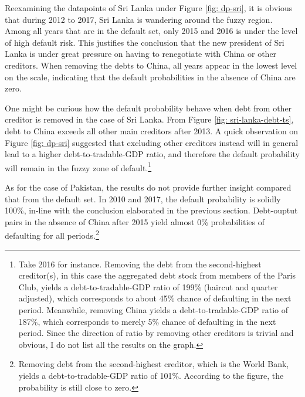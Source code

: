 Reexamining the datapoints of Sri Lanka under Figure \ref{fig: dp-sri}, it is obvious that during 2012 to 2017, Sri Lanka is wandering around the fuzzy region. Among all years that are in the default set, only 2015 and 2016 is under the level of high default risk. This justifies the conclusion that the new president of Sri Lanka is under great pressure on having to renegotiate with China or other creditors. When removing the debts to China, all years appear in the lowest level on the scale, indicating that the default probabilities in the absence of China are zero.

One might be curious how the default probability behave when debt from other creditor is removed in the case of Sri Lanka. From Figure \ref{fig: sri-lanka-debt-ts}, debt to China exceeds all other main creditors after 2013. A quick observation on Figure \ref{fig: dp-sri} suggested that excluding other creditors instead will in general lead to a higher debt-to-tradable-GDP ratio, and therefore the default probability will remain in the fuzzy zone of default.\footnote{%
    Take 2016 for instance. Removing the debt from the second-highest creditor(s), in this case the aggregated debt stock from members of the Paris Club, yields a debt-to-tradable-GDP ratio of 199\% (haircut and quarter adjusted), which corresponds to about 45\% chance of defaulting in the next period. Meanwhile, removing China yields a debt-to-tradable-GDP ratio of 187\%, which corresponds to merely 5\% chance of defaulting in the next period. Since the direction of ratio by removing other creditors is trivial and obvious, I do not list all the results on the graph.
}

As for the case of Pakistan, the results do not provide further insight compared that from the default set. In 2010 and 2017, the default probability is solidly 100\%, in-line with the conclusion elaborated in the previous section. Debt-ouptut pairs in the absence of China after 2015 yield almost 0\% probabilities of defaulting for all periods.\footnote{%
    Removing debt from the second-highest creditor, which is the World Bank, yields a debt-to-tradable-GDP ratio of 101\%. According to the figure, the probability is still close to zero.
}

